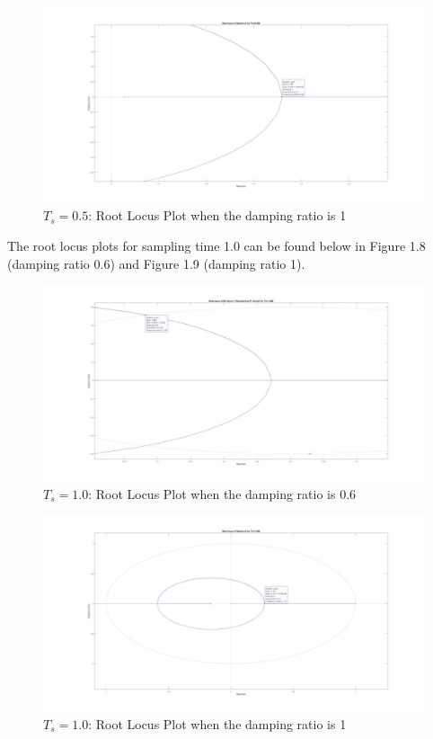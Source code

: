 \documentclass[stu, a4paper, 12pt, floatsintext]{apa7}
\numberwithin{figure}{section}
\numberwithin{table}{section}
\numberwithin{equation}{section}
\begin{document}
\begin{figure}[H]
    \caption{$T_s = 0.5$: Root Locus Plot when the damping ratio is 1}
    \label{fig:0.5_Ts_damping_1}
    \centering
    \includegraphics[width=1.1\textwidth]{pictures/task2_0.5_damping_1.jpg}
\end{figure}
The root locus plots for sampling time 1.0 can be found below in Figure 1.8 (damping ratio 0.6) and Figure 1.9 (damping ratio 1). 
\begin{figure}[H]
    \caption{$T_s = 1.0$: Root Locus Plot when the damping ratio is 0.6}
    \label{fig:1.0_Ts_damping_0.6}
    \centering
    \includegraphics[width=1.1\textwidth]{pictures/task2_1.0_damping_0.6.jpg}
\end{figure}
\begin{figure}[H]
    \caption{$T_s = 1.0$: Root Locus Plot when the damping ratio is 1}
    \label{fig:1.0_Ts_damping_1}
    \centering
    \includegraphics[width=1.1\textwidth]{pictures/task2_1.0_damping_1.jpg}
\end{figure}
\end{document}
